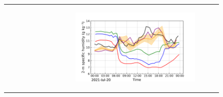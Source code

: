 \begin{figure}[hbtp]
\begin{tabular}{cc}
\begin{subfigure}[t]{0.5\textwidth}
        \end{subfigure} &
        \begin{subfigure}[t]{0.5\textwidth}
            \caption{}
            \includegraphics[width=\textwidth]{images/chap5/IOP_TS/TS_2021-07-20_cendrosa_q2m.png}
        \end{subfigure} \\


\end{tabular}
\end{figure}
